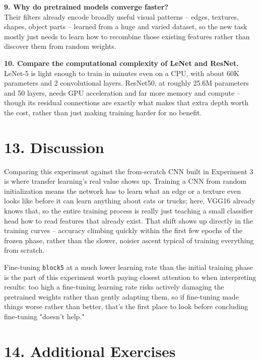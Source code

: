 \documentclass[11pt]{article}
\begin{document}
\textbf{9. Why do pretrained models converge faster?}\\
Their filters already encode broadly useful visual patterns -- edges, textures, shapes, object parts -- learned from a huge and varied dataset, so the new task mostly just needs to learn how to recombine those existing features rather than discover them from random weights.

\textbf{10. Compare the computational complexity of LeNet and ResNet.}\\
LeNet-5 is light enough to train in minutes even on a CPU, with about 60K parameters and 2 convolutional layers. ResNet50, at roughly 25.6M parameters and 50 layers, needs GPU acceleration and far more memory and compute -- though its residual connections are exactly what makes that extra depth worth the cost, rather than just making training harder for no benefit.


\section*{13. Discussion}

Comparing this experiment against the from-scratch CNN built in Experiment 3 is where transfer learning's real value shows up. Training a CNN from random initialization means the network has to learn what an edge or a texture even looks like before it can learn anything about cats or trucks; here, VGG16 already knows that, so the entire training process is really just teaching a small classifier head how to read features that already exist. That shift shows up directly in the training curves -- accuracy climbing quickly within the first few epochs of the frozen phase, rather than the slower, noisier ascent typical of training everything from scratch.

Fine-tuning \texttt{block5} at a much lower learning rate than the initial training phase is the part of this experiment worth paying closest attention to when interpreting results: too high a fine-tuning learning rate risks actively damaging the pretrained weights rather than gently adapting them, so if fine-tuning made things worse rather than better, that's the first place to look before concluding fine-tuning "doesn't help."


\section*{14. Additional Exercises}
\end{document}
